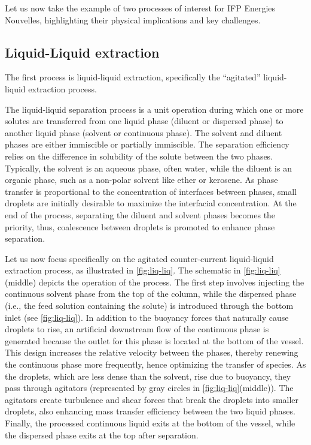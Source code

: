 Let us now take the example of two processes of interest for IFP Energies Nouvelles, highlighting their physical implications and key challenges.  


\subsection{Liquid-Liquid extraction}


The first process is liquid-liquid extraction, specifically the ``agitated'' liquid-liquid extraction process. 

The liquid-liquid separation process is a unit operation during which one or more solutes are transferred from one liquid phase (diluent or dispersed phase) to another liquid phase (solvent or continuous phase).
The solvent and diluent phases are either immiscible or partially immiscible.
The separation efficiency relies on the difference in solubility of the solute between the two phases.
Typically, the solvent is an aqueous phase, often water, while the diluent is an organic phase, such as a non-polar solvent like ether or kerosene.
As phase transfer is proportional to the concentration of interfaces between phases, small droplets are initially desirable to maximize the interfacial concentration.
At the end of the process, separating the diluent and solvent phases becomes the priority, thus, coalescence between droplets is promoted to enhance phase separation.

Let us now focus specifically on the agitated counter-current liquid-liquid extraction process, as illustrated in \ref{fig:liq-liq}. 
The schematic in \ref{fig:liq-liq} (middle) depicts the operation of the process.
The first step involves injecting the continuous solvent phase from the top of the column, while the dispersed phase (i.e., the feed solution containing the solute) is introduced through the bottom inlet (see \ref{fig:liq-liq}). 
In addition to the buoyancy forces that naturally cause droplets to rise, an artificial downstream flow of the continuous phase is generated because the outlet for this phase is located at the bottom of the vessel. 
This design increases the relative velocity between the phases, thereby renewing the continuous phase more frequently, hence optimizing the transfer of species.
As the droplets, which are less dense than the solvent, rise due to buoyancy, they pass through agitators (represented by gray circles in \ref{fig:liq-liq}(middle)). 
The agitators create turbulence and shear forces that break the droplets into smaller droplets, also enhancing mass transfer efficiency between the two liquid phases. 
Finally, the processed continuous liquid exits at the bottom of the vessel, while the dispersed phase exits at the top after separation. 

